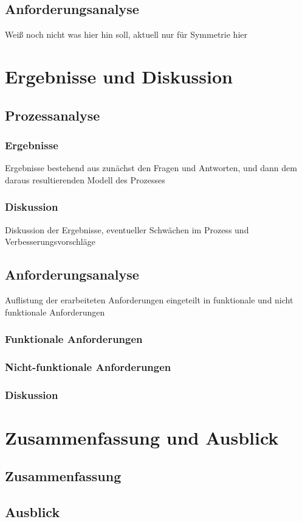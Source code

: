 \documentclass[11pt,a4paper]{scrartcl}
\begin{document}
\subsection{Anforderungsanalyse}\label{subsec:anforderungsanalyse-methodik}
Weiß noch nicht was hier hin soll, aktuell nur für Symmetrie hier

\section{Ergebnisse und Diskussion}\label{sec:results}
\subsection{Prozessanalyse}\label{subsec:prozessanalyse-results}
\subsubsection{Ergebnisse}\label{subsubsec:prozessanalyse-results}
Ergebnisse bestehend aus zunächst den Fragen und Antworten, und dann dem daraus resultierenden Modell des Prozesses
\subsubsection{Diskussion}\label{subsubsec:prozessanalyse-discussion}
Diskussion der Ergebnisse, eventueller Schwächen im Prozess und Verbesserungsvorschläge
\subsection{Anforderungsanalyse}\label{subsec:anforderungsanalyse-results}
Auflistung der erarbeiteten Anforderungen eingeteilt in funktionale und nicht funktionale Anforderungen
\subsubsection{Funktionale Anforderungen}\label{subsubsec:functional-requirements}
\subsubsection{Nicht-funktionale Anforderungen}\label{subsubsec:non-functional-requirements}
\subsubsection{Diskussion}\label{subsubsec:anforderungsanalyse-discussion}

\section{Zusammenfassung und Ausblick}\label{sec:summary}
\subsection{Zusammenfassung}\label{subsec:summary}
\subsection{Ausblick}\label{subsec:outlook}

\newpage

\printbibliography{}
\listoffigures
\end{document}
